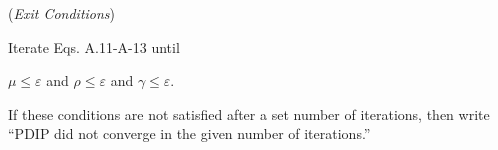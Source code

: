 \noindent ({\em Exit Conditions})

Iterate Eqs. A.11-A-13 until
 
$\mu \leq \varepsilon$ and $\rho \leq \varepsilon$ and $\gamma \leq \varepsilon$. 

\noindent If these conditions are not satisfied after a set number of iterations, then write
``PDIP did not converge in the given number of iterations.''




